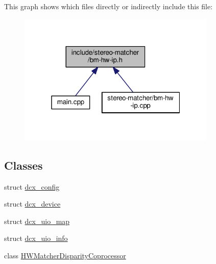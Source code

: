 This graph shows which files directly or indirectly include this file\+:
\nopagebreak
\begin{figure}[H]
\begin{center}
\leavevmode
\includegraphics[width=268pt]{bm-hw-ip_8h__dep__incl}
\end{center}
\end{figure}
\subsection*{Classes}
\begin{DoxyCompactItemize}
\item 
struct \hyperlink{structdcx__config}{dcx\+\_\+config}
\item 
struct \hyperlink{structdcx__device}{dcx\+\_\+device}
\item 
struct \hyperlink{structdcx__uio__map}{dcx\+\_\+uio\+\_\+map}
\item 
struct \hyperlink{structdcx__uio__info}{dcx\+\_\+uio\+\_\+info}
\item 
class \hyperlink{classHWMatcherDisparityCoprocessor}{H\+W\+Matcher\+Disparity\+Coprocessor}
\end{DoxyCompactItemize}
